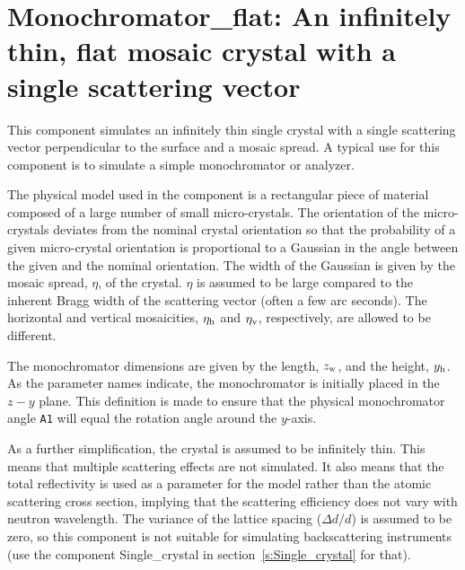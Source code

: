 
\section{Monochromator\_flat: An infinitely thin, flat mosaic crystal with
a single scattering vector}
\label{s:monochromator_flat}



This component simulates an infinitely thin single
crystal with a single scattering vector perpendicular to the
surface and a mosaic spread. A typical
use for this component is to simulate a simple monochromator or analyzer.

The physical model used in the component is a rectangular piece of
material composed of a large number of small micro-crystals.
The orientation of the
micro-crystals deviates from the nominal crystal orientation so that the
probability of a given micro-crystal orientation is proportional to a
Gaussian in the angle between the given and the nominal orientation. The
width of the Gaussian is given by the mosaic spread, $\eta$, of the crystal.
$\eta$ is assumed to be large compared to the inherent Bragg width of the
scattering vector (often a few arc seconds).
The horizontal and vertical mosaicities, $\eta_{\rm h}$ and $\eta_{\rm v}$,
respectively, are allowed to be different.

The monochromator dimensions are given by the length, $z_{\rm w}$, and
the height, $y_{\rm h}$. As the parameter names indicate, the
monochromator is initially placed in the $z-y$ plane. This definition
is made to ensure that the physical monochromator angle \verb+A1+
will equal the \MCS rotation angle around the $y$-axis.

As a further simplification, the crystal is assumed to be infinitely
thin. This means that multiple scattering effects are not simulated. It
also means that the total reflectivity is used as a parameter for
the model rather than the atomic scattering cross section, implying that
the scattering efficiency does not vary with neutron wavelength.
The variance
of the lattice spacing ($\Delta d/d$) is assumed to be zero, so this
component is not suitable for simulating backscattering instruments (use
the component {\rm Single\_crystal}
in section~\ref{s:Single_crystal} for that).

